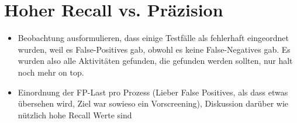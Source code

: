 \section{Hoher Recall vs. Präzision}\label{sec:hoher-recall-vs.-prazision}

\begin{itemize}
    \item Beobachtung ausformulieren, dass einige Testfälle als fehlerhaft eingeordnet wurden, weil es False-Positives gab, obwohl es keine False-Negatives gab. Es wurden also alle Aktivitäten gefunden, die gefunden werden sollten, nur halt noch mehr on top.
    \item Einordnung der FP-Last pro Prozess (Lieber False Positives, als dass etwas übersehen wird, Ziel war sowieso ein Vorscreening), Diskussion darüber wie nützlich hohe Recall Werte sind
\end{itemize}